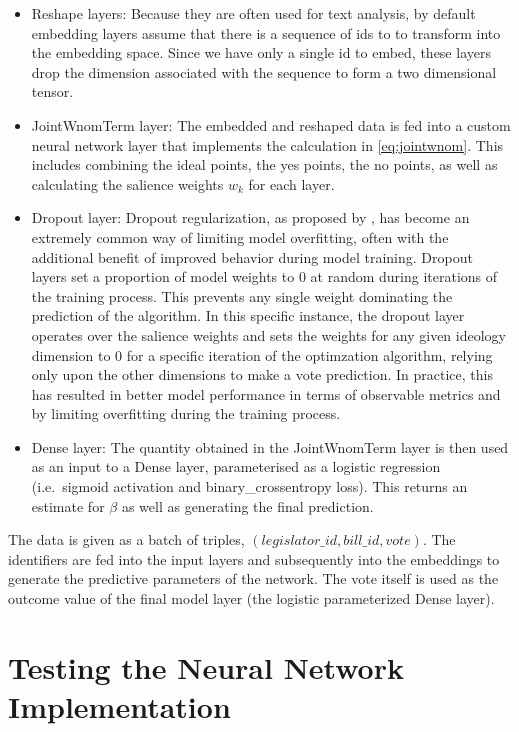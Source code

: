 \documentclass[11pt,]{article}
\begin{document}
\begin{itemize}
\item
  Reshape layers: Because they are often used for text analysis, by
  default embedding layers assume that there is a sequence of ids to to
  transform into the embedding space. Since we have only a single id to
  embed, these layers drop the dimension associated with the sequence to
  form a two dimensional tensor.
\item
  JointWnomTerm layer: The embedded and reshaped data is fed into a
  custom neural network layer that implements the calculation in
  \ref{eq:jointwnom}. This includes combining the ideal points, the yes
  points, the no points, as well as calculating the salience weights
  \(w_k\) for each layer.
\item
  Dropout layer: Dropout regularization, as proposed by \cite{dropout},
  has become an extremely common way of limiting model overfitting,
  often with the additional benefit of improved behavior during model
  training. Dropout layers set a proportion of model weights to 0 at
  random during iterations of the training process. This prevents any
  single weight dominating the prediction of the algorithm. In this
  specific instance, the dropout layer operates over the salience
  weights and sets the weights for any given ideology dimension to 0 for
  a specific iteration of the optimzation algorithm, relying only upon
  the other dimensions to make a vote prediction. In practice, this has
  resulted in better model performance in terms of observable metrics
  and by limiting overfitting during the training process.
\item
  Dense layer: The quantity obtained in the JointWnomTerm layer is then
  used as an input to a Dense layer, parameterised as a logistic
  regression (i.e.~sigmoid activation and binary\_crossentropy loss).
  This returns an estimate for \(\beta\) as well as generating the final
  prediction.
\end{itemize}

The data is given as a batch of triples,
\((legislator\_id, bill\_id, vote)\). The identifiers are fed into the
input layers and subsequently into the embeddings to generate the
predictive parameters of the network. The vote itself is used as the
outcome value of the final model layer (the logistic parameterized Dense
layer).

\section{Testing the Neural Network
Implementation}\label{testing-the-neural-network-implementation}
\end{document}
